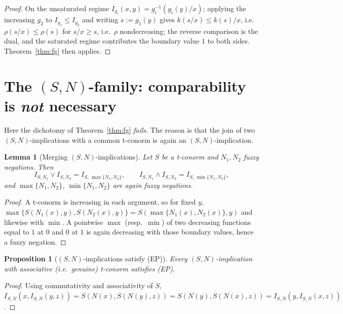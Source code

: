 \documentclass{amsart}
\theoremstyle{plain}
\newtheorem{lemma}{Lemma}
\newtheorem{proposition}{Proposition}
\theoremstyle{definition}
\begin{document}
\begin{proof}
On the unsaturated regime $I_{g_i}(x,y)=g_i^{-1}(g_i(y)/x)$; applying the increasing $g_2$
to $I_{g_1}\le I_{g_2}$ and writing $s:=g_1(y)$ gives $k(s/x)\le k(s)/x$, i.e.\ $\rho(s/x)\le
\rho(s)$ for $s/x\ge s$, i.e.\ $\rho$ nondecreasing; the reverse comparison is the dual, and
the saturated regime contributes the boundary value $1$ to both sides.  Theorem~\ref{thm:fg}
then applies.
\end{proof}

\section{The $(S,N)$-family: comparability is \emph{not} necessary}\label{sec:SN}

Here the dichotomy of Theorem~\ref{thm:fg} \emph{fails}.  The reason is that the join of
two $(S,N)$-implications with a common t-conorm is again an $(S,N)$-implication.

\begin{lemma}[Merging $(S,N)$-implications]\label{lem:SNmerge}
Let $S$ be a t-conorm and $N_1,N_2$ fuzzy negations.  Then
\[
I_{S,N_1}\vee I_{S,N_2}=I_{S,\,\max\{N_1,N_2\}},\qquad
I_{S,N_1}\wedge I_{S,N_2}=I_{S,\,\min\{N_1,N_2\}},
\]
and $\max\{N_1,N_2\}$, $\min\{N_1,N_2\}$ are again fuzzy negations.
\end{lemma}

\begin{proof}
A t-conorm is increasing in each argument, so for fixed $y$,
$\max\{S(N_1(x),y),S(N_2(x),y)\}=S(\max\{N_1(x),N_2(x)\},y)$ and likewise with $\min$.
A pointwise $\max$ (resp.\ $\min$) of two decreasing functions equal to $1$ at $0$ and $0$
at $1$ is again decreasing with those boundary values, hence a fuzzy negation.
\end{proof}

\begin{proposition}[$(S,N)$-implications satisfy (EP)]\label{prop:SNEP}
Every $(S,N)$-implication with associative (i.e.\ genuine) t-conorm satisfies
\textup{(EP)}.
\end{proposition}

\begin{proof}
Using commutativity and associativity of $S$,
$I_{S,N}(x,I_{S,N}(y,z))=S(N(x),S(N(y),z))=S(N(y),S(N(x),z))=I_{S,N}(y,I_{S,N}(x,z))$.
\end{proof}
\end{document}
